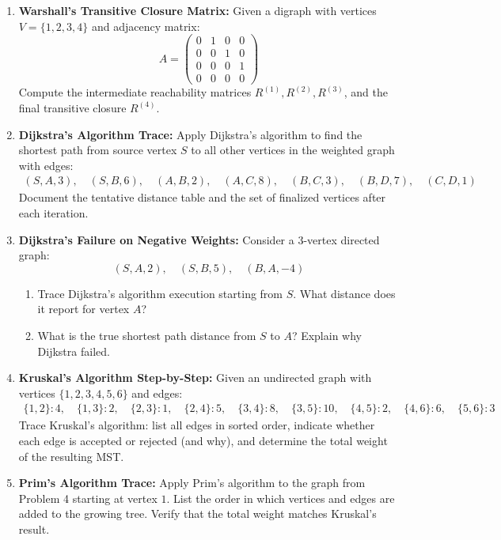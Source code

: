 \begin{enumerate}
    \item \textbf{Warshall's Transitive Closure Matrix:}
    Given a digraph with vertices $V = \{1, 2, 3, 4\}$ and adjacency matrix:
    \begin{equation}
    A = \begin{pmatrix}
    0 & 1 & 0 & 0 \\
    0 & 0 & 1 & 0 \\
    0 & 0 & 0 & 1 \\
    0 & 0 & 0 & 0
    \end{pmatrix}
    \end{equation}
    Compute the intermediate reachability matrices $R^{(1)}, R^{(2)}, R^{(3)}$, and the final transitive closure $R^{(4)}$.

    \item \textbf{Dijkstra's Algorithm Trace:}
    Apply Dijkstra's algorithm to find the shortest path from source vertex $S$ to all other vertices in the weighted graph with edges:
    \begin{align*}
    (S, A, 3), \quad (S, B, 6), \quad (A, B, 2), \quad (A, C, 8), \quad (B, C, 3), \quad (B, D, 7), \quad (C, D, 1)
    \end{align*}
    Document the tentative distance table and the set of finalized vertices after each iteration.

    \item \textbf{Dijkstra's Failure on Negative Weights:}
    Consider a 3-vertex directed graph:
    \begin{equation}
    (S, A, 2), \quad (S, B, 5), \quad (B, A, -4)
    \end{equation}
    \begin{enumerate}
        \item Trace Dijkstra's algorithm execution starting from $S$. What distance does it report for vertex $A$?
        \item What is the true shortest path distance from $S$ to $A$? Explain why Dijkstra failed.
    \end{enumerate}

    \item \textbf{Kruskal's Algorithm Step-by-Step:}
    Given an undirected graph with vertices $\{1, 2, 3, 4, 5, 6\}$ and edges:
    \begin{align*}
    \{1, 2\}: 4, \quad \{1, 3\}: 2, \quad \{2, 3\}: 1, \quad \{2, 4\}: 5, \quad \{3, 4\}: 8, \quad \{3, 5\}: 10, \quad \{4, 5\}: 2, \quad \{4, 6\}: 6, \quad \{5, 6\}: 3
    \end{align*}
    Trace Kruskal's algorithm: list all edges in sorted order, indicate whether each edge is accepted or rejected (and why), and determine the total weight of the resulting MST.

    \item \textbf{Prim's Algorithm Trace:}
    Apply Prim's algorithm to the graph from Problem 4 starting at vertex $1$. List the order in which vertices and edges are added to the growing tree. Verify that the total weight matches Kruskal's result.
\end{enumerate}

